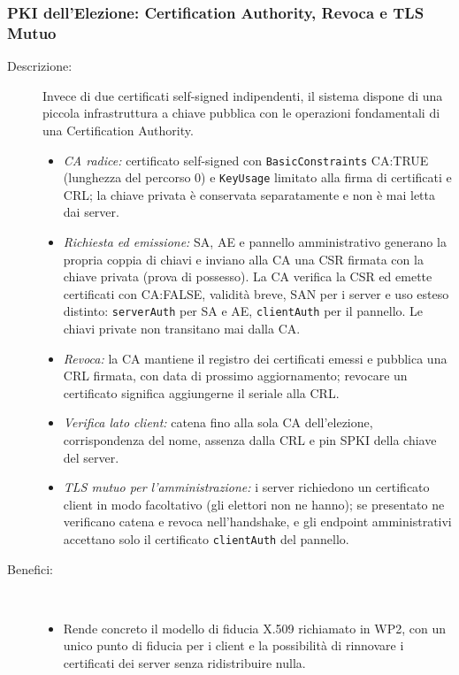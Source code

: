 \documentclass[12pt,a4paper]{article}
\begin{document}
\subsubsection{PKI dell'Elezione: Certification Authority, Revoca e TLS Mutuo}
\label{sec:mod42}

\begin{description}
  \item[Descrizione:] Invece di due certificati self-signed indipendenti, il sistema dispone di una piccola infrastruttura a chiave pubblica con le operazioni fondamentali di una Certification Authority.
    \begin{itemize}
      \item \textit{CA radice:} certificato self-signed con \texttt{BasicConstraints} CA:TRUE (lunghezza del percorso 0) e \texttt{KeyUsage} limitato alla firma di certificati e CRL; la chiave privata è conservata separatamente e non è mai letta dai server.
      \item \textit{Richiesta ed emissione:} SA, AE e pannello amministrativo generano la propria coppia di chiavi e inviano alla CA una CSR firmata con la chiave privata (prova di possesso). La CA verifica la CSR ed emette certificati con CA:FALSE, validità breve, SAN per i server e uso esteso distinto: \texttt{serverAuth} per SA e AE, \texttt{clientAuth} per il pannello. Le chiavi private non transitano mai dalla CA.
      \item \textit{Revoca:} la CA mantiene il registro dei certificati emessi e pubblica una CRL firmata, con data di prossimo aggiornamento; revocare un certificato significa aggiungerne il seriale alla CRL.
      \item \textit{Verifica lato client:} catena fino alla sola CA dell'elezione, corrispondenza del nome, assenza dalla CRL e pin SPKI della chiave del server.
      \item \textit{TLS mutuo per l'amministrazione:} i server richiedono un certificato client in modo facoltativo (gli elettori non ne hanno); se presentato ne verificano catena e revoca nell'handshake, e gli endpoint amministrativi accettano solo il certificato \texttt{clientAuth} del pannello.
    \end{itemize}
  \item[Benefici:] \
    \begin{itemize}
      \item Rende concreto il modello di fiducia X.509 richiamato in WP2, con un unico punto di fiducia per i client e la possibilità di rinnovare i certificati dei server senza ridistribuire nulla.

\end{itemize}
\end{description}
\end{document}
